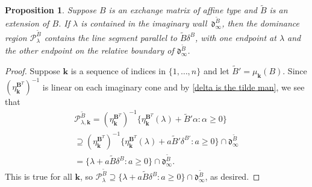 \documentclass{amsart}
\newtheorem{proposition}{Proposition}[section]
\theoremstyle{definition}
\theoremstyle{remark}
\numberwithin{equation}{section}
\newcommand{\set}[1]{{\lbrace #1 \rbrace}}
\newcommand{\0}{{\mathbf{0}}}
\newcommand{\kk}{\mathbf{k}}
\newcommand{\tB}{{\tilde{B}}}
\newcommand{\BB}{\mathbf{B}}
\renewcommand{\P}{\mathcal{P}}
\renewcommand{\d}{{\mathfrak d}}
\begin{document}
\begin{proposition}\label{affine main extended partial}
Suppose $B$ is an exchange matrix of affine type and $\tB$ is an extension of $B$.
If $\lambda$ is contained in the imaginary wall~$\d^\tB_\infty$, then the dominance region $\P^\tB_\lambda$ \emph{contains} the line segment parallel to $\tB\delta^B$, with one endpoint at $\lambda$ and the other endpoint on the relative boundary of $\d^\tB_\infty$.
\end{proposition}
\begin{proof}
Suppose $\kk$ is a sequence of indices in $\set{1,\ldots,n}$ and let $\tB'=\mu_\kk(B)$.
Since $(\eta_\kk^{\BB^T})^{-1}$ is linear on each imaginary cone and by \cref{delta is the tilde man}, we see that 
\begin{multline*}
\P^\tB_{\lambda,\kk}=(\eta_\kk^{\BB^T})^{-1}\set{\eta^{\BB^T}_\kk(\lambda)+\tB'\alpha:\alpha\ge0}\\
\supseteq(\eta_\kk^{\BB^T})^{-1}\set{\eta^{\BB^T}_\kk(\lambda)+a\tB'\delta^{B'}:a\ge0}\cap\d^\tB_\infty\\
=\set{\lambda+a\tB\delta^B:a\ge0}\cap\d^\tB_\infty. 
\end{multline*}
This is true for all $\kk$, so $\P^\tB_\lambda\supseteq\set{\lambda+a\tB\delta^B:a\ge0}\cap\d^\tB_\infty$, as desired.
\end{proof}
\end{document}
